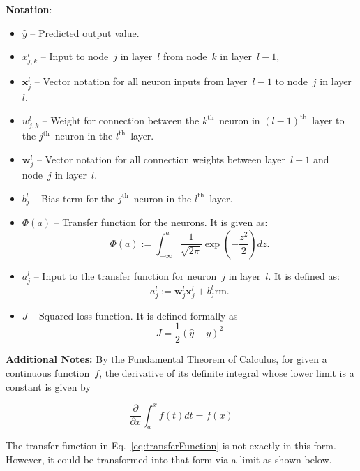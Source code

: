 \documentclass{report}
\newcommand{\w}{\mathbf{w}}
\newcommand{\xvec}{\mathbf{x}}
\newcommand{\yhat}{\hat{y}}
\begin{document}
  \textbf{Notation}: 
  \begin{itemize}
    \item $\yhat$ -- Predicted output value.
    \item $x_{j,k}^{l}$ -- Input to node~$j$ in layer~$l$ from node~$k$ in layer~$l-1$,
    \item $\xvec_{j}^{l}$ -- Vector notation for all neuron inputs from layer~$l-1$ to node~$j$ in layer~$l$.
    \item $w_{j,k}^{l}$ -- Weight for connection between the ${k^{\text{th}}}$~neuron in ${(l-1)^{\text{th}}}$~layer to the ${j^{\text{th}}}$~neuron in the ${l^{\text{th}}}$~layer.
    \item $\w_{j}^{l}$ -- Vector notation for all connection weights between layer~$l-1$ and node~$j$ in layer~$l$.
    \item $b_{j}^{l}$ -- Bias term for the ${j^{\text{th}}}$~neuron in the $l^{\text{th}}$~layer.
    \item $\Phi(a)$ -- Transfer function for the neurons.  It is given as:
    \begin{equation}
      \Phi(a) :=\int_{-\infty}^{a}\frac{1}{\sqrt{2\pi}} \exp\left( -\frac{z^{2}}{2} \right)dz\label{eq:transferFunction} \textrm{.}
    \end{equation}
    \item $a_{j}^{l}$ -- Input to the transfer function for neuron~$j$ in layer~$l$.  It is defined as:
    \begin{equation}
      a_{j}^{l} := \w_{j}^{l} \xvec_{j}^{l} + b_{j}^{l}\text{rm}.
    \end{equation}
    \item $J$ -- Squared loss function.  It is defined formally as 
    \begin{equation}
      J = \frac{1}{2} (\yhat -y)^2
    \end{equation}
  \end{itemize}
  
  \textbf{Additional Notes:} By the Fundamental Theorem of Calculus, for given a continuous function~$f$, the derivative of its definite integral whose lower limit is a constant is given by
  
  \begin{equation}
    \frac{\partial}{\partial x}\int_{a}^{x}f(t)dt=f(x)
  \end{equation}
  
  The transfer function in Eq.~\ref{eq:transferFunction} is not exactly in this form.  However, it could be transformed into that form via a limit as shown below.
  
\end{document}
